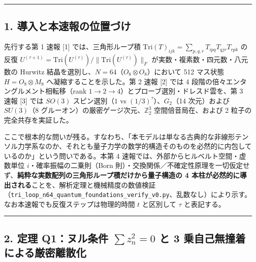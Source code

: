 \documentclass[
  a4paper,
]{ltjsarticle}
\begin{document}
\begin{center}\rule{0.5\linewidth}{0.5pt}\end{center}

\subsection{1.
導入と本速報の位置づけ}\label{ux5c0eux5165ux3068ux672cux901fux5831ux306eux4f4dux7f6eux3065ux3051}

先行する第 1 速報 {[}1{]} では、三角形ループ積
\(\mathrm{Tri}(T)_{ijk} = \sum_{p,q,r} T_{ipq} T_{qjr} T_{rpk}\) の反復
\(U^{(\tau+1)} = \mathrm{Tri}(U^{(\tau)})/\|\mathrm{Tri}(U^{(\tau)})\|_F\)
が実数・複素数・四元数・八元数の Hurwitz
結晶を選別し、\(N = 64\)（\(O_8 \otimes O_8\)）において 512 マス状態
\(H = O_8 \otimes M_8\) へ凝縮することを示した。第 2 速報 {[}2{]} では 4
段階の倍々エンタングルメント相転移（rank
\(1 \to 2 \to 4\)）とプローブ選別・ドレスド雲を、第 3 速報 {[}3{]} では
\(SO(3)\) スピン選別（\(1\) vs \((1/3)^\tau\)）、\(G_2\)（14
次元）および \(SU(3)\)（8
グルーオン）の厳密ゲージ次元、\(\mathbb{Z}_2^3\) 空間倍音局在、および 2
粒子の完全共存を実証した。

ここで根本的な問いが残る。すなわち、「本モデルは単なる古典的な非線形テンソル力学系なのか、それとも量子力学の数学的構造そのものを必然的に内包しているのか」という問いである。本第
4 速報では、外部からヒルベルト空間・虚数単位
\(i\)・確率振幅の二乗則（Born
則）・交換関係／不確定性原理を一切仮定せず、\textbf{純粋な実数配列の三角形ループ積だけから量子構造の
4
本柱が必然的に導出される}ことを、解析定理と機械精度の数値検証（\texttt{tri\_loop\_n64\_quantum\_foundations\_verify\_v0.py}、乱数なし）により示す。なお本速報でも反復ステップは物理的時間
\(t\) と区別して \(\tau\) と表記する。

\begin{center}\rule{0.5\linewidth}{0.5pt}\end{center}

\subsection{\texorpdfstring{2. 定理 Q1：ヌル条件 \(\sum z_n^2 = 0\) と 3
乗自己無撞着による厳密離散化}{2. 定理 Q1：ヌル条件 \textbackslash sum z\_n\^{}2 = 0 と 3 乗自己無撞着による厳密離散化}}\label{ux5b9aux7406-q1ux30ccux30ebux6761ux4ef6-sum-z_n2-0-ux3068-3-ux4e57ux81eaux5df1ux7121ux649eux7740ux306bux3088ux308bux53b3ux5bc6ux96e2ux6563ux5316}
\end{document}
